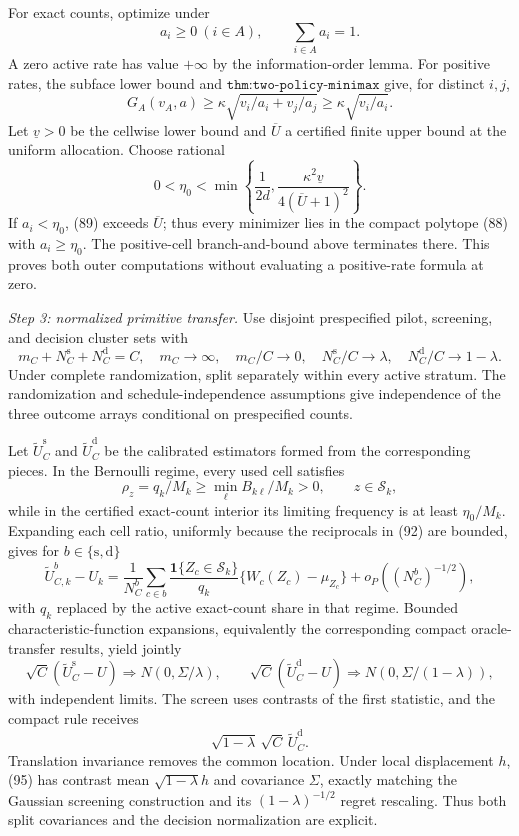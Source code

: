 For exact counts, optimize under
\[
a_i\geq0\ (i\in A),\qquad\sum_{i\in A}a_i=1. \tag{88}
\]
A zero active rate has value \(+\infty\) by the information-order lemma.  For positive rates, the subface lower bound and \(\texttt{thm:two-policy-minimax}\) give, for distinct \(i,j\),
\[
G_A(v_A,a)\geq\kappa\sqrt{v_i/a_i+v_j/a_j}\geq\kappa\sqrt{v_i/a_i}. \tag{89}
\]
Let \(\underline v>0\) be the cellwise lower bound and \(\overline U\) a certified finite upper bound at the uniform allocation.  Choose rational
\[
0<\eta_0<\min\left\{\frac1{2d},\frac{\kappa^2\underline v}{4(\overline U+1)^2}\right\}. \tag{90}
\]
If \(a_i<\eta_0\), (89) exceeds \(\overline U\); thus every minimizer lies in the compact polytope (88) with \(a_i\geq\eta_0\).  The positive-cell branch-and-bound above terminates there.  This proves both outer computations without evaluating a positive-rate formula at zero.

\emph{Step 3: normalized primitive transfer.}
Use disjoint prespecified pilot, screening, and decision cluster sets with
\[
m_C+N_C^{\mathrm s}+N_C^{\mathrm d}=C,\quad
m_C\to\infty,\quad m_C/C\to0,\quad
N_C^{\mathrm s}/C\to\lambda,\quad
N_C^{\mathrm d}/C\to1-\lambda. \tag{91}
\]
Under complete randomization, split separately within every active stratum.  The randomization and schedule-independence assumptions give independence of the three outcome arrays conditional on prespecified counts.

Let \(\widetilde U_C^{\mathrm s}\) and \(\widetilde U_C^{\mathrm d}\) be the calibrated estimators formed from the corresponding pieces.  In the Bernoulli regime, every used cell satisfies
\[
\rho_z=q_k/M_k\geq\min_\ell B_{k\ell}/M_k>0,\qquad z\in\mathcal S_k, \tag{92}
\]
while in the certified exact-count interior its limiting frequency is at least \(\eta_0/M_k\).  Expanding each cell ratio, uniformly because the reciprocals in (92) are bounded, gives for \(b\in\{\mathrm s,\mathrm d\}\)
\[
\widetilde U_{C,k}^{b}-U_k
=\frac1{N_C^b}\sum_{c\in b}\frac{\mathbf1\{Z_c\in\mathcal S_k\}}{q_k}
\{W_c(Z_c)-\mu_{Z_c}\}+o_P((N_C^b)^{-1/2}), \tag{93}
\]
with \(q_k\) replaced by the active exact-count share in that regime.  Bounded characteristic-function expansions, equivalently the corresponding compact oracle-transfer results, yield jointly
\[
\sqrt C(\widetilde U_C^{\mathrm s}-U)\Rightarrow N(0,\Sigma/\lambda),\qquad
\sqrt C(\widetilde U_C^{\mathrm d}-U)\Rightarrow N(0,\Sigma/(1-\lambda)), \tag{94}
\]
with independent limits.  The screen uses contrasts of the first statistic, and the compact rule receives
\[
\sqrt{1-\lambda}\,\sqrt C\,\widetilde U_C^{\mathrm d}. \tag{95}
\]
Translation invariance removes the common location.  Under local displacement \(h\), (95) has contrast mean \(\sqrt{1-\lambda}h\) and covariance \(\Sigma\), exactly matching the Gaussian screening construction and its \((1-\lambda)^{-1/2}\) regret rescaling.  Thus both split covariances and the decision normalization are explicit.

